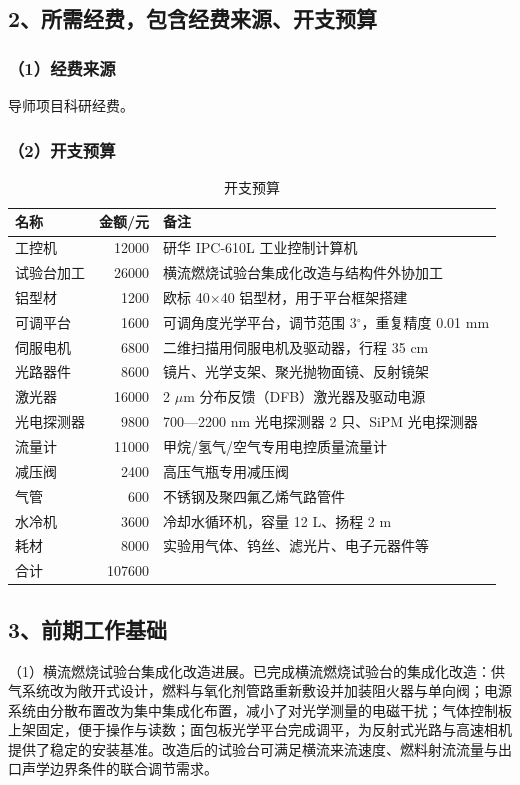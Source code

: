 \documentclass[UTF8,a4paper,zihao=-4,fontset=windows]{ctexart}
\begin{document}
\subsection{2、所需经费，包含经费来源、开支预算}
\subsubsection{（1）经费来源}
导师项目科研经费。

\subsubsection{（2）开支预算}
\begin{table}[H]
\centering
{}
\caption{开支预算}
\setlength{\tabcolsep}{4pt}
\begin{tabular}{l r p{8.6cm}}
\toprule
名称 & 金额/元 & 备注 \\
\midrule
工控机 & 12000 & 研华 IPC-610L 工业控制计算机 \\
试验台加工 & 26000 & 横流燃烧试验台集成化改造与结构件外协加工 \\
铝型材 & 1200 & 欧标 40$\times$40 铝型材，用于平台框架搭建 \\
可调平台 & 1600 & 可调角度光学平台，调节范围 3$^{\circ}$，重复精度 0.01 mm \\
伺服电机 & 6800 & 二维扫描用伺服电机及驱动器，行程 35 cm \\
光路器件 & 8600 & 镜片、光学支架、聚光抛物面镜、反射镜架 \\
激光器 & 16000 & 2 $\mu$m 分布反馈（DFB）激光器及驱动电源 \\
光电探测器 & 9800 & 700—2200 nm 光电探测器 2 只、SiPM 光电探测器 \\
流量计 & 11000 & 甲烷/氢气/空气专用电控质量流量计 \\
减压阀 & 2400 & 高压气瓶专用减压阀 \\
气管 & 600 & 不锈钢及聚四氟乙烯气路管件 \\
水冷机 & 3600 & 冷却水循环机，容量 12 L、扬程 2 m \\
耗材 & 8000 & 实验用气体、钨丝、滤光片、电子元器件等 \\
\midrule
合计 & 107600 &  \\
\bottomrule
\end{tabular}
\end{table}
\vspace{0.4\baselineskip}
\subsection{3、前期工作基础}
（1）横流燃烧试验台集成化改造进展。已完成横流燃烧试验台的集成化改造：供气系统改为敞开式设计，燃料与氧化剂管路重新敷设并加装阻火器与单向阀；电源系统由分散布置改为集中集成化布置，减小了对光学测量的电磁干扰；气体控制板上架固定，便于操作与读数；面包板光学平台完成调平，为反射式光路与高速相机提供了稳定的安装基准。改造后的试验台可满足横流来流速度、燃料射流流量与出口声学边界条件的联合调节需求。
\end{document}

